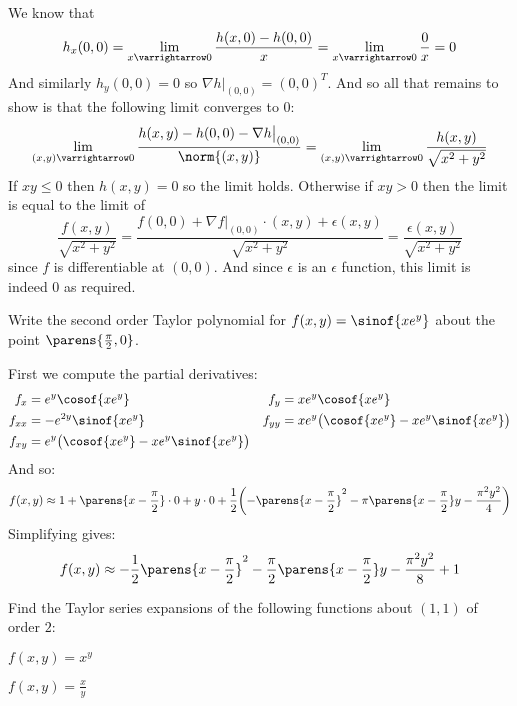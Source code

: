 \documentclass[10pt]{article}
\begin{document}
\begin{blankpp}

    We know that
    \[ h_x(0,0) = \lim_{x\varrightarrow0}\frac{h(x,0)-h(0,0)}x = \lim_{x\varrightarrow0}\frac0x = 0 \]
    And similarly $h_y(0,0)=0$ so $\nabla h\big|_{(0,0)}=(0,0)^T$.
    And so all that remains to show is that the following limit converges to $0$:
    \[ \lim_{(x,y)\varrightarrow0}\frac{h(x,y)-h(0,0)-\nabla h\big|_{(0,0)}}{\norm{(x,y)}} = \lim_{(x,y)\varrightarrow0}\frac{h(x,y)}{\sqrt{x^2+y^2}} \]
    If $xy\leq0$ then $h(x,y)=0$ so the limit holds.
    Otherwise if $xy>0$ then the limit is equal to the limit of
    \[ \frac{f(x,y)}{\sqrt{x^2+y^2}} = \frac{f(0,0)+\nabla f\big|_{(0,0)}\cdot(x,y)+\epsilon(x,y)}{\sqrt{x^2+y^2}} = \frac{\epsilon(x,y)}{\sqrt{x^2+y^2}} \]
    since $f$ is differentiable at $(0,0)$.
    And since $\epsilon$ is an $\epsilon$ function, this limit is indeed $0$ as required.

\end{blankpp}

\begin{exercise*}

    Write the second order Taylor polynomial for $f(x,y)=\sinof{xe^y}$ about the point $\parens{\frac\pi2,0}$.

\end{exercise*}

\begin{blankpp}

    First we compute the partial derivatives:
    \begin{align*}
        f_x     &= e^y\cosof{xe^y}          & f_y &= xe^y\cosof{xe^y} \\
        f_{xx}  &= -e^{2y}\sinof{xe^y}      & f_{yy} &= xe^y\bigl(\cosof{xe^y} - xe^y\sinof{xe^y}\bigl) \\
        f_{xy}  &= e^y\bigl(\cosof{xe^y}-xe^y\sinof{xe^y}\bigl) 
    \end{align*}
    And so:
    \[ f(x,y) \approx 1 + \parens{x-\frac\pi2}\cdot0 + y\cdot0 + \frac12\biggl(-\parens{x-\frac\pi2}^2-\pi\parens{x-\frac\pi2}y-\frac{\pi^2y^2}4\biggr) \]
    Simplifying gives:
    \[ f(x,y) \approx -\frac12\parens{x-\frac\pi2}^2 - \frac\pi2\parens{x-\frac\pi2}y - \frac{\pi^2y^2}8 + 1 \]

\end{blankpp}

\begin{exercise*}

    Find the Taylor series expansions of the following functions about $(1,1)$ of order $2$:
    \benum
        \item $f(x,y)=x^y$
        \item $f(x,y)=\frac xy$
    \eenum

\end{exercise*}
\end{document}
